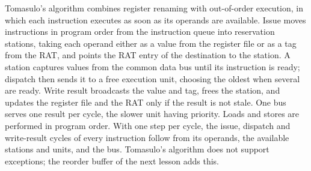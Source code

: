 \documentclass[../main.tex]{subfiles}
\begin{document}
\begin{keypoint}
  Tomasulo's algorithm combines register renaming with out-of-order
  execution, in which each instruction executes as soon as its operands are
  available.  Issue moves instructions in program order from the
  instruction queue into reservation stations, taking each operand either as
  a value from the register file or as a tag from the RAT, and points the RAT
  entry of the destination to the station.  A station captures values from
  the common data bus until its instruction is ready; dispatch then sends it
  to a free execution unit, choosing the oldest when several are ready.
  Write result broadcasts the value and tag, frees the station, and updates
  the register file and the RAT only if the result is not stale.  One bus
  serves one result per cycle, the slower unit having priority.  Loads and
  stores are performed in program order.  With one step per cycle, the issue,
  dispatch and write-result cycles of every instruction follow from its
  operands, the available stations and units, and the bus.  Tomasulo's
  algorithm does not support exceptions; the reorder buffer of the next lesson
  adds this.
\end{keypoint}
\end{document}
